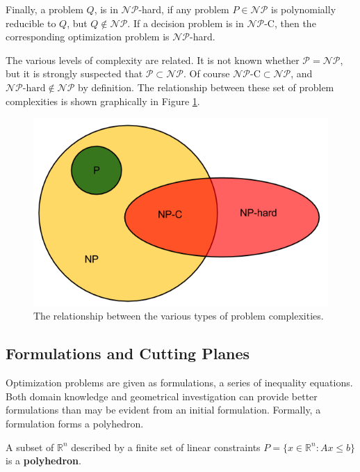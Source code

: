 Finally, a problem $Q$, is in $\mathcal{NP}$-hard, if any problem
$P \in \mathcal{NP}$ is polynomially reducible to $Q$, but
$Q \not\in \mathcal{NP}$. If a decision problem is in $\mathcal{NP}$-C, then the
corresponding optimization problem is $\mathcal{NP}$-hard.

The various levels of complexity are related. It is not known whether
$\mathcal{P} = \mathcal{NP}$, but it is strongly suspected that
$\mathcal{P} \subset \mathcal{NP}$. Of course
$\mathcal{NP}\text{-C} \subset \mathcal{NP}$, and
$\mathcal{NP}\text{-hard} \notin \mathcal{NP}$ by definition. The relationship
between these set of problem complexities is shown graphically in
Figure \ref{fig:complexity}.

\begin{figure}[H]
  \begin{center}
    \includegraphics[width=\linewidth]{./chapters/litreview/complexity.png}
  \caption{The relationship between the various types of problem complexities.}
  \label{fig:complexity}
  \end{center}
\end{figure}


\subsection{Formulations and Cutting Planes}\label{sec:formulations}

Optimization problems are given as formulations, a series of inequality
equations. Both domain knowledge and geometrical investigation can provide
better formulations than may be evident from an initial formulation. Formally, a
formulation forms a polyhedron.

\begin{define}\label{def:polyhedron}
A subset of $\mathbb{R}^n$ described by a finite set of linear constraints $P
= \{ x \in \mathbb{R}^n : Ax \leq b\}$ is a \textbf{polyhedron}.
\end{define}

